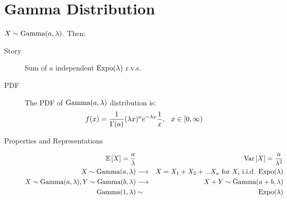 \documentclass[11pt]{article}
\theoremstyle{definition}
\theoremstyle{remark}
\newcommand\independent{\protect\mathpalette{\protect\independenT}{\perp}}
\def\independenT#1#2{\mathrel{\rlap{$#1#2$}\mkern2mu{#1#2}}}
\newcommand{\E}[1]{\mathbb{E}\left[ #1 \right]}
\renewcommand{\var}[1]{\textnormal{Var}\left[ #1 \right]}
\newcommand{\Beta}{\textnormal{Beta}}
\newcommand{\Expo}{\textnormal{Expo}}
\newcommand{\Gam}{\textnormal{Gamma}}
\begin{document}
\section{Gamma Distribution}
$X \sim \Gam(a, \lambda)$. Then:
\begin{description}
\item[Story] Sum of $a$ independent $\Expo(\lambda)$ r.v.s.
\item[PDF] The PDF of $\Gam(a, \lambda)$ distribution is:
\begin{eqnarray*}
f(x) = \frac{1}{\Gamma(a)}(\lambda x)^ae^{-\lambda x}\frac{1}{x},
\hspace{.1 in}
x \in [0, \infty)
\end{eqnarray*}
\item[Properties and Representations]
\vspace{-.4 cm}
	\begin{eqnarray*}
		\E{X} = \frac{a}{\lambda} && \var{X} = \frac{a}{\lambda^2} \\
		X \sim \Gam(a, \lambda) &\longrightarrow& X = X_1 + X_2 + ... X_a \textnormal{ for $X_i$ i.i.d. $\Expo(\lambda)$} \\
		X \sim \Gam(a, \lambda), Y \sim \Gam(b, \lambda) &\longrightarrow& X+Y \sim \Gam(a+b, \lambda) \\
		\Gam(1, \lambda) &\sim& \Expo(\lambda) 
	\end{eqnarray*}
\end{description}

\end{document}
